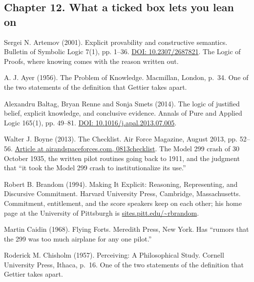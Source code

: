 \documentclass[11pt,twoside]{article}
\theoremstyle{thielethm}
\theoremstyle{thieledef}
\theoremstyle{thieledef}
\theoremstyle{thieledef}
\theoremstyle{thielethm}
\theoremstyle{thieleobs}
\theoremstyle{thielethm}
\begin{document}
\subsection*{Chapter 12. What a ticked box lets you lean on}

\noindent Sergei N. Artemov (2001). Explicit provability and constructive semantics. Bulletin of Symbolic Logic 7(1), pp. 1--36. \href{https://doi.org/10.2307/2687821}{DOI: 10.2307/2687821}. The Logic of Proofs, where knowing comes with the reason written out.
\par\medskip

\noindent A. J. Ayer (1956). The Problem of Knowledge. Macmillan, London, p.~34. One of the two statements of the definition that Gettier takes apart.
\par\medskip

\noindent Alexandru Baltag, Bryan Renne and Sonja Smets (2014). The logic of justified belief, explicit knowledge, and conclusive evidence. Annals of Pure and Applied Logic 165(1), pp. 49--81. \href{https://doi.org/10.1016/j.apal.2013.07.005}{DOI: 10.1016/j.apal.2013.07.005}.
\par\medskip

\noindent Walter J. Boyne (2013). The Checklist. Air Force Magazine, August 2013, pp. 52--56. \href{https://www.airandspaceforces.com/article/0813checklist/}{Article at airandspaceforces.com, 0813checklist}. The Model 299 crash of 30 October 1935, the written pilot routines going back to 1911, and the judgment that ``it took the Model 299 crash to institutionalize its use.''
\par\medskip

\noindent Robert B. Brandom (1994). Making It Explicit: Reasoning, Representing, and Discursive Commitment. Harvard University Press, Cambridge, Massachusetts. Commitment, entitlement, and the score speakers keep on each other; his home page at the University of Pittsburgh is \href{https://sites.pitt.edu/~rbrandom/}{sites.pitt.edu/\textasciitilde rbrandom}.
\par\medskip

\noindent Martin Caidin (1968). Flying Forts. Meredith Press, New York. Has ``rumors that the 299 was too much airplane for any one pilot.''
\par\medskip

\noindent Roderick M. Chisholm (1957). Perceiving: A Philosophical Study. Cornell University Press, Ithaca, p.~16. One of the two statements of the definition that Gettier takes apart.
\par\medskip
\end{document}
